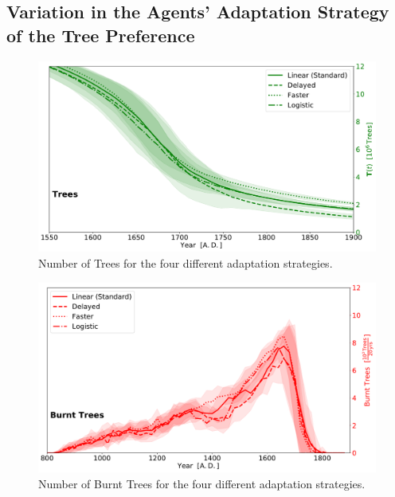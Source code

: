 \subsection*{Variation in the Agents' Adaptation Strategy of the Tree Preference}
\begin{figure}[h]
	\centering
	\includegraphics[width=0.9\linewidth]{images/Results/TPref/TPrefAdaption_Trees}
	\caption{Number of Trees for the four different adaptation strategies.}
	\label{fig:tprefadaptiontrees}
\end{figure}
\begin{figure}[h]
	\centering
	\includegraphics[width=0.90\linewidth]{images/Results/TPref/TPrefAdaption_BurntTrees}
	\caption{Number of Burnt Trees for the four different adaptation strategies.}
	\label{fig:tprefadaptionburnttrees}
\end{figure}